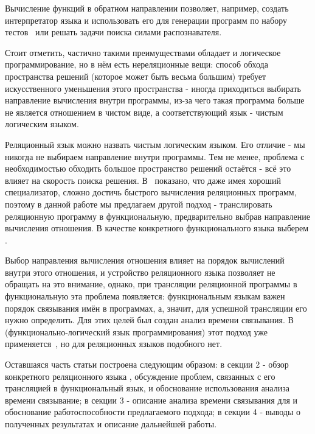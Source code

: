 \documentclass[conference]{IEEEtran}
\begin{document}
Вычисление функций в обратном направлении позволяет, например, создать интерпретатор языка и использовать его для генерации программ по набору тестов~\cite{byrd2017unified} или решать задачи поиска силами распознавателя.~\cite{lozov2019relational}

Стоит отметить, частично такими преимуществами обладает и логическое программирование, но в нём есть нереляционные вещи: способ обхода пространства решений (которое может быть весьма большим) требует искусственного уменьшения этого пространства - иногда приходиться выбирать направление вычисления внутри программы, из-за чего такая программа больше не является отношением в чистом виде, а соответствующий язык - чистым логическим языком.

Реляционный язык можно назвать чистым логическим языком. Его отличие - мы никогда не выбираем направление внутри программы. Тем не менее, проблема с необходимостью обходить большое пространство решений остаётся - всё это влияет на скорость поиска решения. В~\cite{jones1993partial} показано, что даже имея хороший специализатор, сложно достичь быстрого вычисления реляционных программ, поэтому в данной работе мы предлагаем другой подход - транслировать реляционную программу в функциональную, предварительно выбрав направление вычисления отношения. В качестве конкретного функционального языка выберем \haskell.

Выбор направления вычисления отношения влияет на порядок вычислений внутри этого отношения, и устройство реляционного языка позволяет не обращать на это внимание, однако, при трансляции реляционной программы в функциональную эта проблема появляется: функциональным языкам важен порядок связывания имён в программах, а, значит, для успешной трансляции его нужно определить. Для этих целей был создан анализ времени связывания. В \mercury (функционально-логический язык программирования) этот подход уже применяется~\cite{vanhoof2004binding}, но для реляционных языков подобного нет.

Оставшаяся часть статьи построена следующим образом: в секции 2 - обзор конкретного реляционного языка \miniKanren, обсуждение проблем, связанных с его трансляцией в функциональный язык, и обоснование использования анализа времени связывание; в секции 3 - описание анализа времени связывания для \miniKanren и обоснование работоспособности предлагаемого подхода; в секции 4 - выводы о полученных результатах и описание дальнейшей работы.

\section{\miniKanren}
\end{document}
